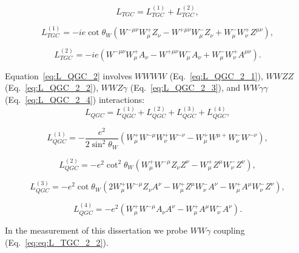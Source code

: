 \begin{equation} \label{eq:L_TGC_2}
L_{TGC} = L_{TGC}^{(1)} + L_{TGC}^{(2)},
\end{equation}

\begin{equation} \label{eq:L_TGC_2_1}
L_{TGC}^{(1)} = -ie \cot \theta_W (W^{-\mu\nu} W^{+}_\mu Z_\nu - W^{+\mu\nu} W^-_\mu Z_\nu +W^-_\mu W^+_\nu Z^{\mu\nu}),
\end{equation}

\begin{equation} \label{eq:L_TGC_2_2}
L_{TGC}^{(2)} = - ie(W^{-\mu\nu}W^+_\mu A_\nu - W^{+\mu\nu}W^-_\mu A_\nu + W^-_\mu W^+_\nu A^{\mu\nu}).
\end{equation}

Equation~\ref{eq:L_QGC_2} involves $WWWW$ (Eq.~\ref{eq:L_QGC_2_1}), $WWZZ$ (Eq.~\ref{eq:L_QGC_2_2}), $WWZ\gamma$ (Eq.~\ref{eq:L_QGC_2_3}), and $WW\gamma\gamma$ (Eq.~\ref{eq:L_QGC_2_4}) interactions:\\

\begin{equation} \label{eq:L_QGC_2}
L_{QGC} = L_{QGC}^{(1)} + L_{QGC}^{(2)} + L_{QGC}^{(3)} + L_{QGC}^{(4)},
\end{equation}

\begin{equation} \label{eq:L_QGC_2_1}
L_{QGC}^{(1)} = -\frac{e^2}{2\sin^2 \theta_W}(W^+_\mu W^{-\mu}W^+_\nu W^{-\nu} - W^+_\mu W^{\mu +} W^-_\nu W^{-\nu}),
\end{equation}

\begin{equation} \label{eq:L_QGC_2_2}
L_{QGC}^{(2)} = - e^2 \cot^2 \theta_W (W^+_\mu W^{-\mu} Z_\nu Z^{\nu} - W^+_\mu Z^{\mu} W^-_\nu Z^{\nu}),
\end{equation}

\begin{equation} \label{eq:L_QGC_2_3}
L_{QGC}^{(3)} = - e^2 \cot \theta_W (2 W_\mu^+ W^{-\mu} Z_\nu A^{\nu} - W^{+}_\mu Z^\mu W^-_\nu A^\nu - W^{+}_\mu A^\mu W^-_\nu Z^\nu),
\end{equation}

\begin{equation} \label{eq:L_QGC_2_4}
L_{QGC}^{(4)} = - e^2 (W^+_\mu W^{-\mu} A_\nu A^{\nu} - W^+_\mu A^{\mu} W^-_\nu A^{\nu}).
\end{equation}

In the measurement of this dissertation we probe $WW\gamma$ coupling (Eq.~\ref{eq:eq:L_TGC_2_2}).\\

